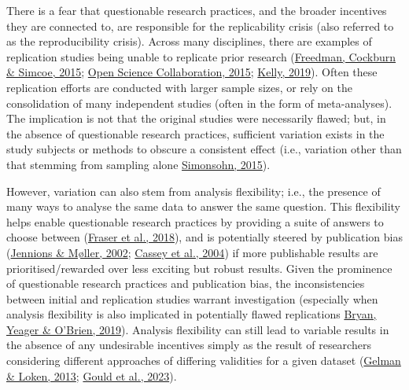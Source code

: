 \documentclass[10pt,a4paper]{article}
\begin{document}
There is a fear that questionable research practices, and the broader incentives they are connected to, are responsible for the replicability crisis (also referred to as the reproducibility crisis).
Across many disciplines, there are examples of replication studies being unable to replicate prior research (\protect\hyperlink{ref-freedman_economics_2015}{Freedman, Cockburn \& Simcoe, 2015}; \protect\hyperlink{ref-open_science_collaboration_estimating_2015}{Open Science Collaboration, 2015}; \protect\hyperlink{ref-kelly_rate_2019}{Kelly, 2019}).
Often these replication efforts are conducted with larger sample sizes, or rely on the consolidation of many independent studies (often in the form of meta-analyses).
The implication is not that the original studies were necessarily flawed; but, in the absence of questionable research practices, sufficient variation exists in the study subjects or methods to obscure a consistent effect (i.e., variation other than that stemming from sampling alone \protect\hyperlink{ref-simonsohn_small_2015}{Simonsohn, 2015}).

However, variation can also stem from analysis flexibility; i.e., the presence of many ways to analyse the same data to answer the same question.
This flexibility helps enable questionable research practices by providing a suite of answers to choose between (\protect\hyperlink{ref-fraser_questionable_2018}{Fraser et al., 2018}), and is potentially steered by publication bias (\protect\hyperlink{ref-jennions_publication_2002}{Jennions \& Møller, 2002}; \protect\hyperlink{ref-cassey_survey_2004}{Cassey et al., 2004}) if more publishable results are prioritised/rewarded over less exciting but robust results.
Given the prominence of questionable research practices and publication bias, the inconsistencies between initial and replication studies warrant investigation (especially when analysis flexibility is also implicated in potentially flawed replications \protect\hyperlink{ref-bryan_replicator_2019}{Bryan, Yeager \& O'Brien, 2019}).
Analysis flexibility can still lead to variable results in the absence of any undesirable incentives simply as the result of researchers considering different approaches of differing validities for a given dataset (\protect\hyperlink{ref-gelman_garden_2013}{Gelman \& Loken, 2013}; \protect\hyperlink{ref-gould_same_2023}{Gould et al., 2023}).
\end{document}
